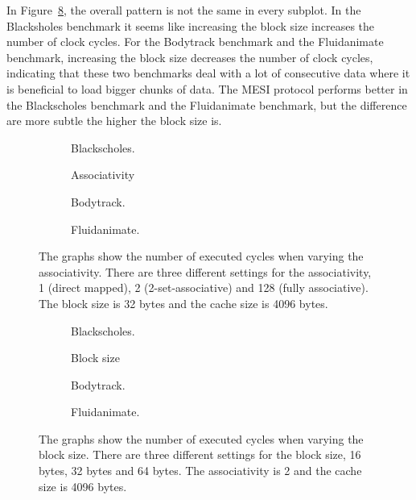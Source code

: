 In Figure~\ref{fig:block_size}, the overall pattern is not the same in every subplot.
In the Blacksholes benchmark it seems like increasing the block size increases the
number of clock cycles. For the Bodytrack benchmark and  the Fluidanimate benchmark,
increasing the block size decreases the number of clock cycles, indicating that these
two benchmarks deal with a lot of consecutive data where it is beneficial to load bigger
chunks of data. The MESI protocol performs better in the Blackscholes benchmark and the
Fluidanimate benchmark, but the difference are more subtle the higher the block size is.

\begin{figure}[H]
    \centering
    \begin{subfigure}[b]{0.33\textwidth}
        \centering
        \caption{Blackscholes.}\label{fig:associativity_blackscholes}
    \end{subfigure}%
    \hfill
    \begin{subfigure}[b]{0.33\textwidth}
        \centering
        Associativity\par\medskip
        \caption{Bodytrack.}\label{fig:associativity_bodytrack}
    \end{subfigure}%
    \hfill
    \begin{subfigure}[b]{0.33\textwidth}
        \centering
        \caption{Fluidanimate.}\label{fig:associativity_fluidanimate}
    \end{subfigure}
    \hfill
    \caption{The graphs show the number of executed cycles when varying the associativity. There are three different settings for the associativity, 1 (direct mapped), 2 (2-set-associative) and 128 (fully associative). The block size is 32 bytes and the cache size is 4096 bytes.}\label{fig:associativity}
\end{figure}

\begin{figure}[H]
    \centering
    \begin{subfigure}[b]{0.33\textwidth}
        \centering
        \caption{Blackscholes.}\label{fig:block_size_blackscholes}
    \end{subfigure}%
    \hfill
    \begin{subfigure}[b]{0.33\textwidth}
        \centering
        Block size\par\medskip
        \caption{Bodytrack.}\label{fig:block_size_bodytrack}
    \end{subfigure}%
    \hfill
    \begin{subfigure}[b]{0.33\textwidth}
        \centering
        \caption{Fluidanimate.}\label{fig:block_size_fluidanimate}
    \end{subfigure}
    \hfill
    \caption{The graphs show the number of executed cycles when varying the block size. There are three different settings for the block size, 16 bytes, 32 bytes and 64 bytes. The associativity is 2 and the cache size is 4096 bytes.}\label{fig:block_size}
\end{figure}


